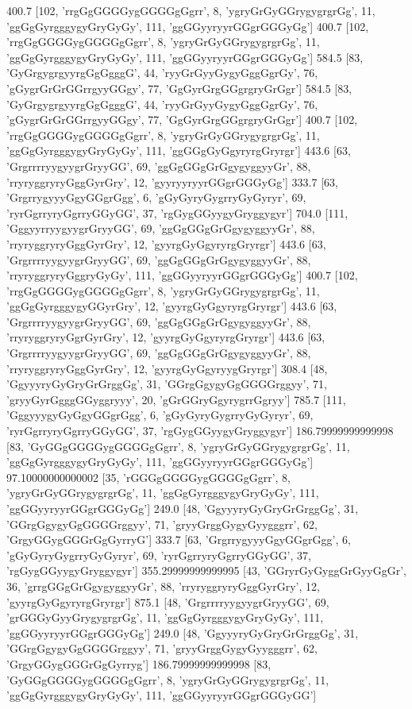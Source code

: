 400.7 [102, 'rrgGgGGGGygGGGGgGgrr', 8, 'ygryGrGyGGrygygrgrGg', 11, 'ggGgGyrgggygyGryGyGy', 111, 'ggGGyyryyrGGgrGGGyGg']
400.7 [102, 'rrgGgGGGGygGGGGgGgrr', 8, 'ygryGrGyGGrygygrgrGg', 11, 'ggGgGyrgggygyGryGyGy', 111, 'ggGGyyryyrGGgrGGGyGg']
584.5 [83, 'GyGrgygrgyyrgGgGgggG', 44, 'ryyGrGyyGygyGggGgrGy', 76, 'gGygrGrGrGGrrgyyGGgy', 77, 'GgGyrGrgGGgrgryGrGgr']
584.5 [83, 'GyGrgygrgyyrgGgGgggG', 44, 'ryyGrGyyGygyGggGgrGy', 76, 'gGygrGrGrGGrrgyyGGgy', 77, 'GgGyrGrgGGgrgryGrGgr']
400.7 [102, 'rrgGgGGGGygGGGGgGgrr', 8, 'ygryGrGyGGrygygrgrGg', 11, 'ggGgGyrgggygyGryGyGy', 111, 'ggGGgGyGgyryrgGryrgr']
443.6 [63, 'GrgrrrryygyygrGryyGG', 69, 'ggGgGGgGrGgygyggyyGr', 88, 'rryryggryryGggGyrGry', 12, 'gyyryyryyrGGgrGGGyGg']
333.7 [63, 'GrgrrygyyyGgyGGgrGgg', 6, 'gGyGyryGygrryGyGyryr', 69, 'ryrGgrryryGgrryGGyGG', 37, 'rgGygGGyygyGryggygyr']
704.0 [111, 'GggyyrryygyygrGryyGG', 69, 'ggGgGGgGrGgygyggyyGr', 88, 'rryryggryryGggGyrGry', 12, 'gyyrgGyGgyryrgGryrgr']
443.6 [63, 'GrgrrrryygyygrGryyGG', 69, 'ggGgGGgGrGgygyggyyGr', 88, 'rryryggryryGggryGyGy', 111, 'ggGGyyryyrGGgrGGGyGg']
400.7 [102, 'rrgGgGGGGygGGGGgGgrr', 8, 'ygryGrGyGGrygygrgrGg', 11, 'ggGgGyrgggygyGGyrGry', 12, 'gyyrgGyGgyryrgGryrgr']
443.6 [63, 'GrgrrrryygyygrGryyGG', 69, 'ggGgGGgGrGgygyggyyGr', 88, 'rryryggryryGgrGyrGry', 12, 'gyyrgGyGgyryrgGryrgr']
443.6 [63, 'GrgrrrryygyygrGryyGG', 69, 'ggGgGGgGrGgygyggyyGr', 88, 'rryryggryryGggGyrGry', 12, 'gyyrgGyGgyryygGryrgr']
308.4 [48, 'GgyyyryGyGryGrGrggGg', 31, 'GGrgGgygyGgGGGGrggyy', 71, 'gryyGyrGgggGGyggryyy', 20, 'gGrGGryGgyrygrrGgryy']
785.7 [111, 'GggyyygyGyGgyGGgrGgg', 6, 'gGyGyryGygrryGyGyryr', 69, 'ryrGgrryryGgrryGGyGG', 37, 'rgGygGGyygyGryggygyr']
186.79999999999998 [83, 'GyGGgGGGGygGGGGgGgrr', 8, 'ygryGrGyGGrygygrgrGg', 11, 'ggGgGyrgggygyGryGyGy', 111, 'ggGGyyryyrGGgrGGGyGg']
97.10000000000002 [35, 'rGGGgGGGGygGGGGgGgrr', 8, 'ygryGrGyGGrygygrgrGg', 11, 'ggGgGyrgggygyGryGyGy', 111, 'ggGGyyryyrGGgrGGGyGg']
249.0 [48, 'GgyyyryGyGryGrGrggGg', 31, 'GGrgGgygyGgGGGGrggyy', 71, 'gryyGrggGygyGyygggrr', 62, 'GrgyGGygGGGrGgGyrryG']
333.7 [63, 'GrgrrygyyyGgyGGgrGgg', 6, 'gGyGyryGygrryGyGyryr', 69, 'ryrGgrryryGgrryGGyGG', 37, 'rgGygGGyygyGryggygyr']
355.29999999999995 [43, 'GGryrGyGyggGrGyyGgGr', 36, 'grrgGGgGrGgygyggyyGr', 88, 'rryryggryryGggGyrGry', 12, 'gyyrgGyGgyryrgGryrgr']
875.1 [48, 'GrgrrrryygyygrGryyGG', 69, 'grGGGyGyyGrygygrgrGg', 11, 'ggGgGyrgggygyGryGyGy', 111, 'ggGGyyryyrGGgrGGGyGg']
249.0 [48, 'GgyyyryGyGryGrGrggGg', 31, 'GGrgGgygyGgGGGGrggyy', 71, 'gryyGrggGygyGyygggrr', 62, 'GrgyGGygGGGrGgGyrryg']
186.79999999999998 [83, 'GyGGgGGGGygGGGGgGgrr', 8, 'ygryGrGyGGrygygrgrGg', 11, 'ggGgGyrgggygyGryGyGy', 111, 'ggGGyyryyrGGgrGGGyGG']
